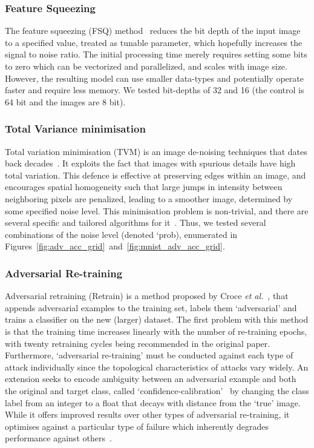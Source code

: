 \documentclass[journal]{IEEEtran}
\begin{document}
\subsubsection{Feature Squeezing}
The feature squeezing (FSQ) method~\cite{feature_squeezing} reduces the bit depth of the input image to a specified value, treated as tunable parameter, which hopefully increases the signal to noise ratio.
The initial processing time merely requires setting some bits to zero which can be vectorized and parallelized, and scales with image size.
However, the resulting model can use smaller data-types and potentially operate faster and require less memory.
We tested bit-depths of 32 and 16 (the control is 64 bit and the images are 8 bit).

\subsubsection{Total Variance minimisation}
Total variation minimisation (TVM) is an image de-noising techniques that dates back decades~\cite{rudin1992nonlinear}.
It exploits the fact that images with spurious details have high total variation.
This defence is effective at preserving edges within an image, and encourages spatial homogeneity such that large jumps in intensity between neighboring pixels are penalized, leading to a smoother image, determined by some specified noise level.
This minimisation problem is non-trivial, and there are several specific and tailored algorithms for it~\cite{chambolle2004algorithm,hadj2018continuation}.
Thus, we tested several combinations of the noise level (denoted `prob),  enumerated in Figures~\ref{fig:adv_acc_grid}~and~\ref{fig:mnist_adv_acc_grid}.

\subsubsection{Adversarial Re-training}
Adversarial retraining (Retrain) is a method proposed by Croce \textit{et al.}~\cite{tsipras_robustness_2019}, that appends adversarial examples to the training set, labels them `adversarial' and trains a classifier on the new (larger) dataset.
The first problem with this method is that the training time increases linearly with the number of re-training epochs, with twenty retraining cycles being recommended in the original paper.
Furthermore, `adversarial re-training' must be conducted against each type of attack individually since the topological characteristics of attacks vary widely.
An extension seeks to encode ambiguity between an adversarial example and both the original and target class, called `confidence-calibration'~\cite{croce_reliable_2020} by changing the class label from an integer to a float that decays with distance from the `true' image.
While it offers improved results over other types of adversarial re-training, it optimises against a particular type of failure which inherently degrades performance against others~\cite{carlini_towards_2017}.
\end{document}
